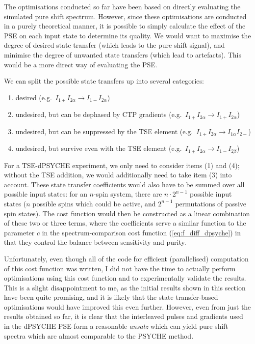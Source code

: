 The optimisations conducted so far have been based on directly evaluating the simulated pure shift spectrum.
However, since these optimisations are conducted in a purely theoretical manner, it is possible to simply calculate the effect of the PSE on each input state to determine its quality.
We would want to maximise the degree of desired state transfer (which leads to the pure shift signal), and minimise the degree of unwanted state transfers (which lead to artefacts).
This would be a more direct way of evaluating the PSE.

We can split the possible state transfers up into several categories:
\begin{enumerate}
    \item desired (e.g.\ $I_{1+}I_{2\alpha} \to I_{1-}I_{2\alpha}$)
    \item undesired, but can be dephased by CTP gradients (e.g.\ $I_{1+}I_{2\alpha} \to I_{1+}I_{2\alpha}$)
    \item undesired, but can be suppressed by the TSE element (e.g.\ $I_{1+}I_{2\alpha} \to I_{1\alpha}I_{2-}$)
    \item undesired, but survive even with the TSE element (e.g.\ $I_{1+}I_{2\alpha} \to I_{1-}I_{2\beta}$)
\end{enumerate}
For a TSE-dPSYCHE experiment, we only need to consider items (1) and (4); without the TSE addition, we would additionally need to take item (3) into account.
These state transfer coefficients would also have to be summed over all possible input states: for an $n$-spin system, there are $n \cdot 2^{n-1}$ possible input states ($n$ possible spins which could be active, and $2^{n-1}$ permutations of passive spin states).
The cost function would then be constructed as a linear combination of these two or three terms, where the coefficients serve a similar function to the parameter $c$ in the spectrum-comparison cost function (\cref{eq:f_diff_dpsyche}) in that they control the balance between sensitivity and purity.


Unfortunately, even though all of the code for efficient (parallelised) computation of this cost function was written, I did not have the time to actually perform optimisations using this cost function and to experimentally validate the results.
This is a slight disappointment to me, as the initial results shown in this section have been quite promising, and it is likely that the state transfer-based optimisations would have improved this even further.
However, even from just the results obtained so far, it is clear that the interleaved pulses and gradients used in the dPSYCHE PSE form a reasonable \textit{ansatz} which can yield pure shift spectra which are almost comparable to the PSYCHE method.
